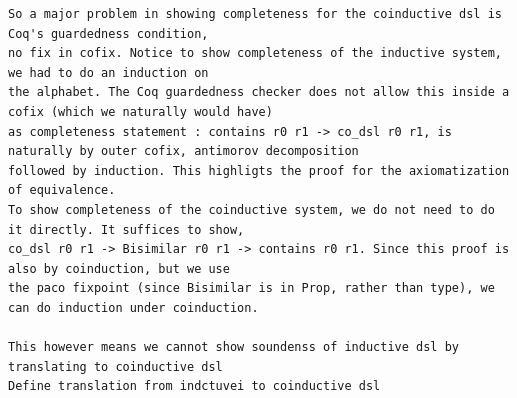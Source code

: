 \documentclass[a4paper,UKenglish,cleveref, autoref, thm-restate]{lipics-v2021}
\begin{document}
\begin{verbatim}
So a major problem in showing completeness for the coinductive dsl is Coq's guardedness condition,
no fix in cofix. Notice to show completeness of the inductive system, we had to do an induction on
the alphabet. The Coq guardedness checker does not allow this inside a cofix (which we naturally would have)
as completeness statement : contains r0 r1 -> co_dsl r0 r1, is naturally by outer cofix, antimorov decomposition
followed by induction. This highligts the proof for the axiomatization of equivalence. 
To show completeness of the coinductive system, we do not need to do it directly. It suffices to show,
co_dsl r0 r1 -> Bisimilar r0 r1 -> contains r0 r1. Since this proof is also by coinduction, but we use 
the paco fixpoint (since Bisimilar is in Prop, rather than type), we can do induction under coinduction.

This however means we cannot show soundenss of inductive dsl by translating to coinductive dsl
Define translation from indctuvei to coinductive dsl


\end{verbatim}
\end{document}
